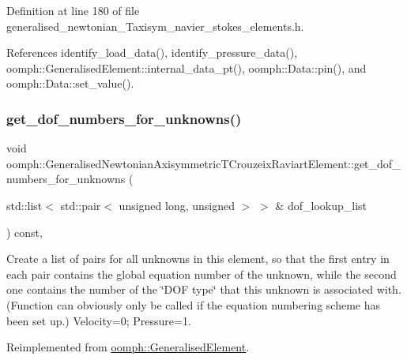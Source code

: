 Definition at line 180 of file generalised\+\_\+newtonian\+\_\+\+Taxisym\+\_\+navier\+\_\+stokes\+\_\+elements.\+h.



References identify\+\_\+load\+\_\+data(), identify\+\_\+pressure\+\_\+data(), oomph\+::\+Generalised\+Element\+::internal\+\_\+data\+\_\+pt(), oomph\+::\+Data\+::pin(), and oomph\+::\+Data\+::set\+\_\+value().

\mbox{\label{classoomph_1_1GeneralisedNewtonianAxisymmetricTCrouzeixRaviartElement_ab6a2ceec6d99232bb562a1c468490367}} 
\subsubsection{\texorpdfstring{get\+\_\+dof\+\_\+numbers\+\_\+for\+\_\+unknowns()}{get\_dof\_numbers\_for\_unknowns()}}
{\footnotesize\ttfamily void oomph\+::\+Generalised\+Newtonian\+Axisymmetric\+T\+Crouzeix\+Raviart\+Element\+::get\+\_\+dof\+\_\+numbers\+\_\+for\+\_\+unknowns (\begin{DoxyParamCaption}\item[{std\+::list$<$ std\+::pair$<$ unsigned long, unsigned $>$ $>$ \&}]{dof\+\_\+lookup\+\_\+list }\end{DoxyParamCaption}) const\hspace{0.3cm}{\ttfamily [inline]}, {\ttfamily [virtual]}}



Create a list of pairs for all unknowns in this element, so that the first entry in each pair contains the global equation number of the unknown, while the second one contains the number of the \char`\"{}\+D\+O\+F type\char`\"{} that this unknown is associated with. (Function can obviously only be called if the equation numbering scheme has been set up.) Velocity=0; Pressure=1. 



Reimplemented from \hyperlink{classoomph_1_1GeneralisedElement_a069f59bfc3e607a5bebba52c6314d777}{oomph\+::\+Generalised\+Element}.



